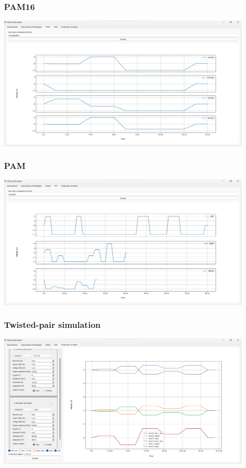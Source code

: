 \documentclass{beamer}
\begin{document}
\begin{frame}
\frametitle{PAM16}
\includegraphics[width=0.95\textwidth]{images/prezentacja_pam16.png}
\end{frame}

\begin{frame}
\frametitle{PAM}
\includegraphics[width=0.95\textwidth]{images/prezentacja_pam.png}
\end{frame}

\begin{frame}
\frametitle{Twisted-pair simulation}
\includegraphics[width=0.95\textwidth]{images/prezentacja_tp.png}
\end{frame}
\end{document}
